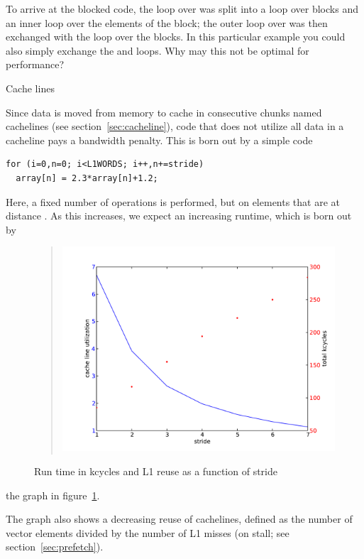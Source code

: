 \begin{exercise}
  To arrive at the blocked code, the loop over  was split into a
  loop over blocks and an inner loop over the elements of the block;
  the outer loop over  was then exchanged with the loop over the
  blocks. In this particular example you could also simply exchange
  the  and  loops. Why may this not be optimal for performance?
\end{exercise}

 {Cache lines}
\label{sec:coding-cacheline}

Since data is moved from memory to cache in consecutive chunks named
cachelines (see section~\ref{sec:cacheline}), code that does not
utilize all data in a cacheline pays a bandwidth penalty. This is born
out by a simple code
\begin{verbatim}
for (i=0,n=0; i<L1WORDS; i++,n+=stride)
  array[n] = 2.3*array[n]+1.2;
\end{verbatim}
Here, a fixed number of operations is performed, but on elements that
are at distance . As this  increases, we expect an
increasing runtime, which is born out by
\begin{figure}[ht]
  \begin{quote}
  \includegraphics[scale=.5]{graphics-public/cacheline8}
  \end{quote}
  \caption{Run time in kcycles and L1 reuse as a function of stride}
  \label{fig:cacheline}
\end{figure}
the graph in figure~\ref{fig:cacheline}.

The graph also shows a decreasing reuse of cachelines, defined as the
number of vector elements divided by the number of L1 misses (on
stall; see section~\ref{sec:prefetch}). 


